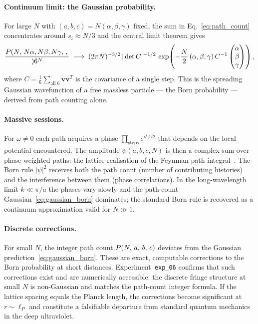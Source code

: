 \paragraph{Continuum limit: the Gaussian probability.}
For large $N$ with $(a,b,c) = N(\alpha,\beta,\gamma)$ fixed, the sum in
Eq.~\eqref{eq:path_count} concentrates around $s_i \approx N/3$ and
the central limit theorem gives
\begin{equation}
    \frac{\pathcount{N}{N\alpha,N\beta,N\gamma}}{6^N}
    \;\longrightarrow\;
    (2\pi N)^{-3/2}\,|\det C|^{-1/2}\,
    \exp\!\left(-\frac{N}{2}\,(\alpha,\beta,\gamma)\,C^{-1}
    \begin{pmatrix}\alpha\\\beta\\\gamma\end{pmatrix}\right),
    \label{eq:gaussian_born}
\end{equation}
where $C = \tfrac{1}{6}\sum_{\text{all }6} \mathbf{v}\mathbf{v}^T$ is the
covariance of a single step.
This is the spreading Gaussian wavefunction of a free massless particle ---
the Born probability --- derived from path counting alone.

\paragraph{Massive sessions.}
For $\omega \neq 0$ each path acquires a phase $\prod_\text{steps}
e^{i\delta\phi/2}$ that depends on the local potential encountered.
The amplitude $\psi(a,b,c,N)$ is then a complex sum over phase-weighted
paths: the lattice realisation of the Feynman path integral~\cite{feynman1948}.
The Born rule $|\psi|^2$ receives both the path count (number of contributing
histories) and the interference between them (phase correlations).
In the long-wavelength limit $k \ll \pi/a$ the phases vary slowly and
the path-count Gaussian~\eqref{eq:gaussian_born} dominates; the standard
Born rule is recovered as a continuum approximation valid for $N \gg 1$.

\paragraph{Discrete corrections.}
For small $N$, the integer path count $P(N,\,a,\,b,\,c)$ deviates from
the Gaussian prediction~\eqref{eq:gaussian_born}.
These are exact, computable corrections to the Born probability at short
distances.
Experiment~\texttt{exp\_06} confirms that such corrections exist and are
numerically accessible: the discrete fringe structure at small $N$ is
non-Gaussian and matches the path-count integer formula.
If the lattice spacing equals the Planck length, the corrections become
significant at $r \sim \ell_P$ and constitute a falsifiable departure from
standard quantum mechanics in the deep ultraviolet.

